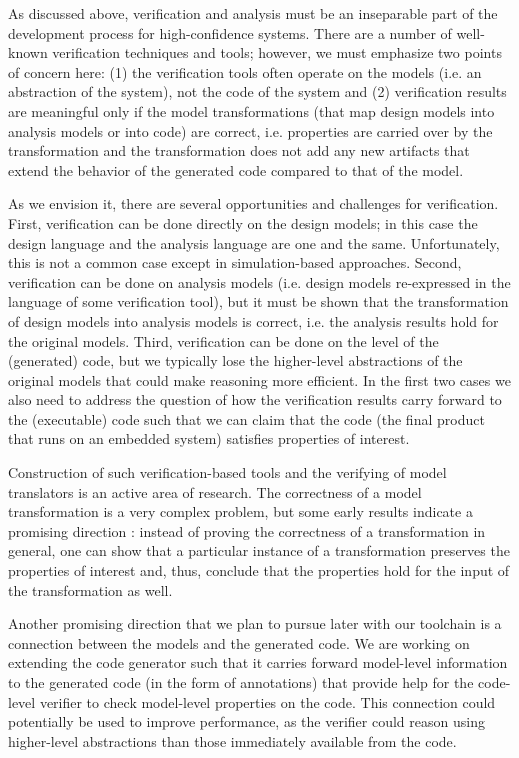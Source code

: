 As discussed above, verification and analysis must be an inseparable part of the development process for high-confidence systems. There are a number of well-known verification techniques and tools; however, we must emphasize two points of concern here: (1) the verification tools often operate on the models (i.e. an abstraction of the system), not the code of the system and (2) verification results are meaningful only if the model transformations (that map design models into analysis models or into code) are correct, i.e. properties are carried over by the transformation and the transformation does not add any new artifacts that extend the behavior of the generated code compared to that of the model.

As we envision it, there are several opportunities and challenges for verification. First, verification can be done directly on the design models; in this case the design language and the analysis language are one and the same. Unfortunately, this is not a common case except in simulation-based approaches. Second, verification can be done on analysis models (i.e. design models re-expressed in the language of some verification tool), but it must be shown that the transformation of design models into analysis models is correct, i.e. the analysis results hold for the original models. Third, verification can be done on the level of the (generated) code, but we typically lose the higher-level abstractions of the original models that could make reasoning more efficient. In the first two cases we also need to address the question of how the verification results carry forward to the (executable) code such that we can claim that the code (the final product that runs on an embedded system) satisfies properties of interest.

Construction of such verification-based tools and the verifying of model translators is an active area of research. The correctness of a model transformation is a very complex problem, but some early results indicate a promising direction \cite{ananth:2006}: instead of proving the correctness of a transformation in general, one can show that a particular instance of a transformation preserves the properties of interest and, thus, conclude that the properties hold for the input of the transformation as well.

Another promising direction that we plan to pursue later with our toolchain is a connection between the models and the generated code. We are working on extending the code generator such that it carries forward model-level information to the generated code (in the form of annotations) that provide help for the code-level verifier to check model-level properties on the code. This connection could potentially be used to improve performance, as the verifier could reason using higher-level abstractions than those immediately available from the code.

